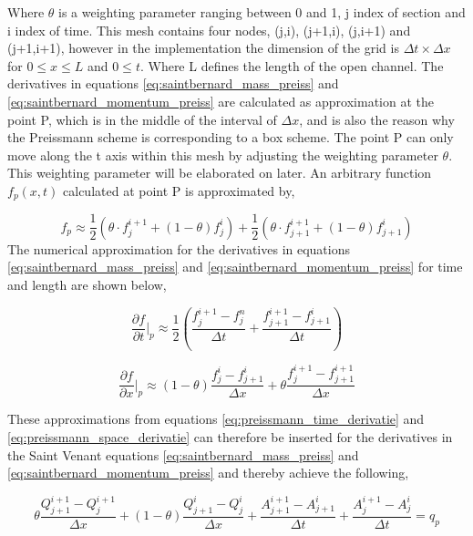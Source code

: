 Where $\theta$ is a weighting parameter ranging between 0 and 1, j index of section and i index of time. This mesh contains four nodes, (j,i), (j+1,i), (j,i+1) and (j+1,i+1), however in the implementation the dimension of the grid is $\Delta t \times \Delta x$ for $0 \leq x \leq L$ and $0\leq t$. Where L defines the length of the open channel. The derivatives in equations \ref{eq:saintbernard_mass_preiss} and \ref{eq:saintbernard_momentum_preiss} are calculated as approximation at the point P, which is in the middle of the interval of $\Delta x$, and is also the reason why the Preissmann scheme is corresponding to a box scheme. The point P can only move along the t axis within this mesh by adjusting the weighting parameter $\theta$. This weighting parameter will be elaborated on later. An arbitrary function $f_p(x,t)$ calculated at point P is approximated by, 

\begin{equation}\label{eq:approximated_function}
	f_p \approx \frac{1}{2} (\theta \cdot f_j^{i+1}+(1-\theta)f_j^i)+\frac{1}{2}(\theta\cdot f_{j+1}^{i+1}+(1-\theta)f_{j+1}^i)
\end{equation}
The numerical approximation for the derivatives in equations \ref{eq:saintbernard_mass_preiss} and \ref{eq:saintbernard_momentum_preiss} for time and length are shown below, 

\begin{equation}\label{eq:preissmann_time_derivatie}
	\frac{\partial f}{\partial t}\bigg \rvert_p \approx \frac{1}{2}\left(\frac{f_j^{i+1}-f_j^n}{\Delta t}+\frac{f_{j+1}^{i+1}-f_{j+1}^i}{\Delta t}\right)
\end{equation}

\begin{equation}\label{eq:preissmann_space_derivatie}
	\frac{\partial f}{\partial x}\bigg \rvert_p \approx (1-\theta)\frac{f_j^i-f_{j+1}^i}{\Delta x}+\theta \frac{f_j^{i+1}-f_{j+1}^{i+1}}{\Delta x}
\end{equation}

These approximations from equations \ref{eq:preissmann_time_derivatie} and \ref{eq:preissmann_space_derivatie} can therefore be inserted for the derivatives in the Saint Venant equations \ref{eq:saintbernard_mass_preiss} and \ref{eq:saintbernard_momentum_preiss} and thereby achieve the following, 

\begin{equation}\label{eq:continuity_eq_preissmann}
	\theta \frac{Q_{j+1}^{i+1}-Q_j^{i+1}}{\Delta x}+(1-\theta)\frac{Q_{j+1}^i - Q_j^i}{\Delta x}+
	\frac{A_{j+1}^{i+1}-A_{j+1}^i}{\Delta t}+\frac{A_{j}^{i+1} - A_j^i}{\Delta t} = q_p
\end{equation}

